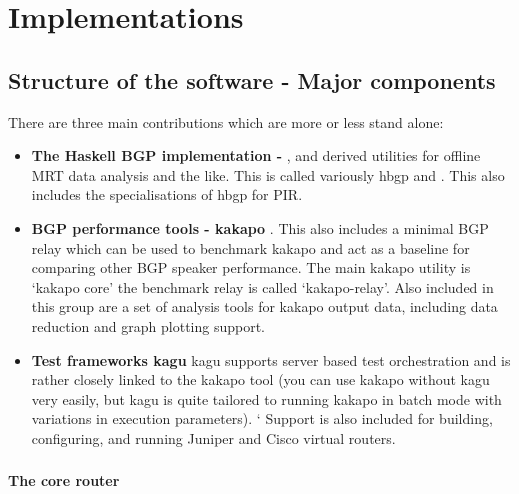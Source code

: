 
\chapter{Implementations}

\section{Structure of the software - Major components}

There are three main contributions which are more or less stand alone:
\begin{itemize}
    \item \textbf{The Haskell BGP implementation - \hbgp}, and derived utilities for offline MRT data analysis and the like.  This is called variously hbgp and \hbgp.  This also includes the specialisations of hbgp for PIR.
    \item \textbf{BGP performance tools - kakapo }.  This also includes a minimal BGP relay which can be used to benchmark kakapo and act as a baseline for comparing other BGP speaker performance.  The main kakapo utility is ‘kakapo core’ \- the benchmark relay is called ‘kakapo-relay’.  Also included in this group are a set of analysis tools for kakapo output data, including data reduction and graph plotting support.
    \item \textbf{Test frameworks \- kagu}  \- kagu supports server based test orchestration and is rather closely linked to the kakapo tool (you can use kakapo without kagu very easily, but kagu is quite tailored to running kakapo in batch mode with variations in execution parameters). `
    Support is also included for building, configuring, and running Juniper and Cisco virtual routers.
\end{itemize}

\subsection{\hbgp}

\subsubsection*{The \hbgp core router}

